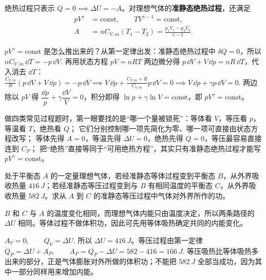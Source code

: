 \documentclass[lang=cn,11pt]{elegantbook}
\begin{document}
绝热过程只表示 \(Q=0\implies \Delta U=-A\)。对理想气体的\textbf{准静态绝热过程}，还满足
\[
\begin{aligned}
pV^\gamma&=\text{const},\qquad TV^{\gamma-1}=\text{const},\\
A&=nC_{V,m}(T_1-T_2)=\frac{p_1V_1-p_2V_2}{\gamma-1}.
\end{aligned}
\]

\begin{remark}
\(pV^\gamma=\text{const}\) 是怎么推出来的？从第一定律出发：准静态绝热过程中 \(\delta Q=0\)，所以
 \(nC_{V,m}\,\dd T=-p\,\dd V.\) 
再用状态方程 \(pV=nRT\) 两边微分得 \(p\,\dd V+V\,\dd p=nR\,\dd T\)，代入消去 \(\dd T\)：
 \(\frac{C_{V,m}}{R}(p\,\dd V+V\,\dd p)=-p\,\dd V \implies V\,\dd p+\frac{C_{V,m}+R}{C_{V,m}}p\,\dd V=0 \implies V\,\dd p+\gamma p\,\dd V=0.\) 
两边除以 \(pV\) 得 \(\dfrac{\dd p}{p}+\gamma\dfrac{\dd V}{V}=0\)，积分即得 \(\ln p+\gamma\ln V=\text{const}\)，即 \(pV^\gamma=\text{const}\)。
\end{remark}

\begin{note}
 做四类常见过程题时，第一眼要找的是“哪一个量被锁死”：等体看 \(V\)，等压看 \(p\)，等温看 \(T\)，绝热看 \(Q\)； 它们分别控制哪一项先简化为零、哪一项可直接由状态方程改写； 等体先得 \(A=0\)，等温先得 \(\Delta U=0\)，绝热先得 \(Q=0\)，等压最容易直接连到 \(C_P\)； 把“绝热”直接等同于“可用绝热方程”，其实只有准静态绝热过程才能写 \(pV^\gamma=\text{const}\)。
\end{note}

\begin{exercise}
处于平衡态 \(A\) 的一定量理想气体，若经准静态等体过程变到平衡态 \(B\)，从外界吸收热量 \(\SI{416}{J}\)；若经准静态等压过程变到与 \(B\) 有相同温度的平衡态 \(C\)，从外界吸收热量 \(\SI{582}{J}\)。求从 \(A\) 到 \(C\) 的准静态等压过程中气体对外界所作的功。
\end{exercise}

\begin{solution}
\(B\) 和 \(C\) 与 \(A\) 的温度变化相同，而理想气体内能只由温度决定，所以两条路径的 \(\Delta U\) 相同。等体过程不做体积功，因此可先用等体吸热确定共同的内能变化。

 \(A_V=0,\qquad Q_V=\Delta U.\) 
所以 \(\Delta U=\SI{416}{J}\)。等压过程由第一定律
 \(Q_P=\Delta U+A_P,\qquad A_P=Q_P-\Delta U =582-416 =\SI{166}{J}.\) 
等压吸热比等体吸热多出来的部分，正是气体膨胀对外所做的体积功；不能把 \(\SI{582}{J}\) 全部当成功，因为其中一部分同样用来增加内能。
\end{solution}
\end{document}
